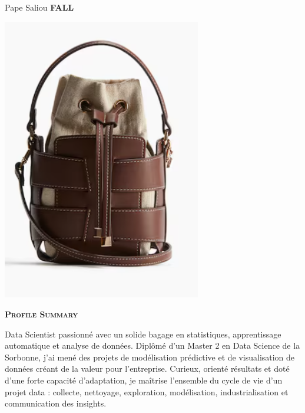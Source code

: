 \documentclass[11pt,a4paper]{article}
\newcommand{\headleft}[1]{\vspace*{3ex}\textsc{\textbf{#1}}\par%
    \vspace*{-1.5ex}\hrulefill\par\vspace*{0.7ex}}
\begin{document}
\setlength{\topskip}{0pt}\setlength{\parindent}{0pt}\setlength{\parskip}{0pt}
\setlength{\fboxsep}{0pt}\pagestyle{empty}\raggedbottom

\begin{minipage}[t]{0.33\textwidth}
\colorbox{cvblue}{\begin{minipage}[t][5mm][t]{\textwidth}\null\hfill\null\end{minipage}}
\vspace{-.2ex}
\colorbox{cvblue!90}{\color{white}
\textwidth
\begin{minipage}[t][293mm][t]{0.82\textwidth}\raggedright
\vspace*{2.5ex}

\Large Pape Saliou \textbf{\textsc{FALL}} \normalsize

\null\hfill\includegraphics[width=0.65\textwidth]{ 311dccad0e264e6a971aa0a5a0caee16.png }\hfill\null

\vspace*{0.5ex}

\headleft{Profile Summary}
Data Scientist passionné avec un solide bagage en statistiques, apprentissage automatique et analyse de données. Diplômé d’un Master 2 en Data Science de la Sorbonne, j’ai mené des projets de modélisation prédictive et de visualisation de données créant de la valeur pour l’entreprise. Curieux, orienté résultats et doté d’une forte capacité d’adaptation, je maîtrise l’ensemble du cycle de vie d’un projet data : collecte, nettoyage, exploration, modélisation, industrialisation et communication des insights.


\end{minipage}}
\end{minipage}
\end{document}
